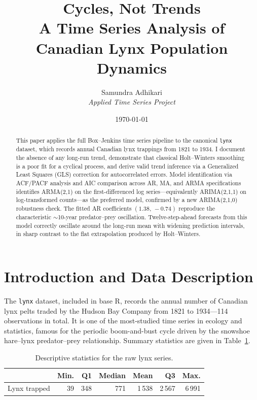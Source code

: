 \documentclass[12pt,a4paper]{article}
\title{\textbf{Cycles, Not Trends}\\[0.5em]
  \large A Time Series Analysis of Canadian Lynx Population Dynamics}
\author{Samundra Adhikari\\[0.5em] \small \textit{Applied Time Series Project}}
\date{\today}
\begin{document}
\maketitle

\begin{abstract}
\noindent
This paper applies the full Box--Jenkins time series pipeline to the canonical
\texttt{lynx} dataset, which records annual Canadian lynx trappings from 1821 to
1934. I document the absence of any long-run trend, demonstrate that classical
Holt--Winters smoothing is a poor fit for a cyclical process, and derive valid
trend inference via a Generalized Least Squares (GLS) correction for autocorrelated
errors. Model identification via ACF/PACF analysis and AIC comparison across AR,
MA, and ARMA specifications identifies ARMA(2,1) on the first-differenced log
series---equivalently ARIMA(2,1,1) on log-transformed counts---as the preferred
model, confirmed by a new ARIMA(2,1,0) robustness check. The fitted AR coefficients
$(1.38,\,-0.74)$ reproduce the characteristic $\sim$10-year predator--prey oscillation.
Twelve-step-ahead forecasts from this model correctly oscillate around the long-run
mean with widening prediction intervals, in sharp contrast to the flat extrapolation
produced by Holt--Winters.
\end{abstract}

\newpage
\tableofcontents
\newpage

\section{Introduction and Data Description}
\label{sec:data}

The \texttt{lynx} dataset, included in base R, records the annual number of Canadian
lynx pelts traded by the Hudson Bay Company from 1821 to 1934---114 observations in
total. It is one of the most-studied time series in ecology and statistics, famous for
the periodic boom-and-bust cycle driven by the snowshoe hare--lynx predator--prey
relationship. Summary statistics are given in Table~\ref{tab:summary}.

\begin{table}[H]
\centering
\caption{Descriptive statistics for the raw lynx series.}
\label{tab:summary}
\begin{tabular}{lrrrrrr}
\toprule
& Min. & Q1 & Median & Mean & Q3 & Max. \\
\midrule
Lynx trapped & 39 & 348 & 771 & 1\,538 & 2\,567 & 6\,991 \\
\bottomrule
\end{tabular}
\end{table}
\end{document}
